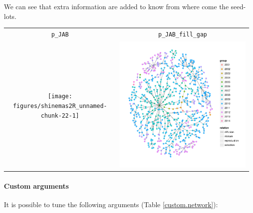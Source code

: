 \documentclass{article}\usepackage[]{graphicx}\usepackage[]{color}
\newenvironment{knitrout}{}{} %
\begin{document}
We can see that extra information are added to know from where come the seed-lots.

\begin{center}
\begin{tabular}{cc}
\texttt{p\_JAB} & \texttt{p\_JAB\_fill\_gap} \\
\begin{knitrout}
\definecolor{shadecolor}{rgb}{0.969, 0.969, 0.969}\color{fgcolor}

{\centering \texttt{[image: figures/shinemas2R\_unnamed-chunk-22-1]} 

}



\end{knitrout}
&
\begin{knitrout}
\definecolor{shadecolor}{rgb}{0.969, 0.969, 0.969}\color{fgcolor}

{\centering \includegraphics[width=.5\textwidth]{figures/shinemas2R_unnamed-chunk-23-1} 

}



\end{knitrout}
\\
\end{tabular}
\end{center}



\paragraph{Custom arguments}

It is possible to tune the following arguments (Table \ref{custom.network}):
\end{document}
